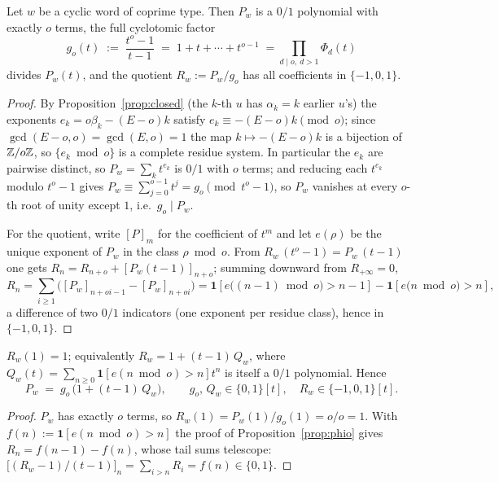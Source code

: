 \begin{prop}\label{prop:phio}
Let $w$ be a cyclic word of coprime type. Then $P_w$ is a $0/1$ polynomial with exactly $o$
terms, the full cyclotomic factor
\[
   g_o(t)\;:=\;\frac{t^{o}-1}{t-1}\;=\;1+t+\cdots+t^{o-1}\;=\!\!\prod_{d\mid o,\ d>1}\!\!\Phi_d(t)
\]
divides $P_w(t)$, and the quotient $R_w:=P_w/g_o$ has all coefficients in $\{-1,0,1\}$.
\end{prop}

\begin{proof}
By Proposition~\ref{prop:closed} (the $k$-th $u$ has $\alpha_k=k$ earlier $u$'s) the exponents
$e_k=o\beta_k-(E-o)k$ satisfy $e_k\equiv-(E-o)k\pmod o$; since $\gcd(E-o,o)=\gcd(E,o)=1$ the map
$k\mapsto-(E-o)k$ is a bijection of $\mathbb{Z}/o\mathbb{Z}$, so $\{e_k\bmod o\}$ is a complete residue system.
In particular the $e_k$ are pairwise distinct, so $P_w=\sum_k t^{e_k}$ is $0/1$ with $o$ terms;
and reducing each $t^{e_k}$ modulo $t^{o}-1$ gives $P_w\equiv\sum_{j=0}^{o-1}t^{j}=g_o\pmod{t^{o}-1}$,
so $P_w$ vanishes at every $o$-th root of unity except $1$, i.e.\ $g_o\mid P_w$.

For the quotient, write $[P]_m$ for the coefficient of $t^m$ and let $e(\rho)$ be the unique
exponent of $P_w$ in the class $\rho\bmod o$. From $R_w\,(t^{o}-1)=P_w\,(t-1)$ one gets
$R_n=R_{n+o}+[P_w(t-1)]_{n+o}$; summing downward from $R_{+\infty}=0$,
\[
   R_n=\sum_{i\ge1}\bigl([P_w]_{n+oi-1}-[P_w]_{n+oi}\bigr)
      =\mathbf 1\!\left[e\bigl((n{-}1)\bmod o\bigr)>n{-}1\right]
      -\mathbf 1\!\left[e\bigl(n\bmod o\bigr)>n\right],
\]
a difference of two $0/1$ indicators (one exponent per residue class), hence in $\{-1,0,1\}$.
\end{proof}

\begin{cor}[Normalisation]\label{cor:Rone}
$R_w(1)=1$; equivalently $R_w=1+(t-1)\,Q_w$, where
$Q_w(t)=\sum_{n\ge0}\mathbf 1\!\left[e(n\bmod o)>n\right]t^{n}$ is itself a $0/1$ polynomial. Hence
\[
   P_w \;=\; g_o\,\bigl(1+(t-1)\,Q_w\bigr),\qquad g_o,\,Q_w\in\{0,1\}[t],\quad R_w\in\{-1,0,1\}[t].
\]
\end{cor}

\begin{proof}
$P_w$ has exactly $o$ terms, so $R_w(1)=P_w(1)/g_o(1)=o/o=1$. With
$f(n):=\mathbf 1[e(n\bmod o)>n]$ the proof of Proposition~\ref{prop:phio} gives $R_n=f(n-1)-f(n)$,
whose tail sums telescope: $\bigl[(R_w-1)/(t-1)\bigr]_n=\sum_{i>n}R_i=f(n)\in\{0,1\}$.
\end{proof}

